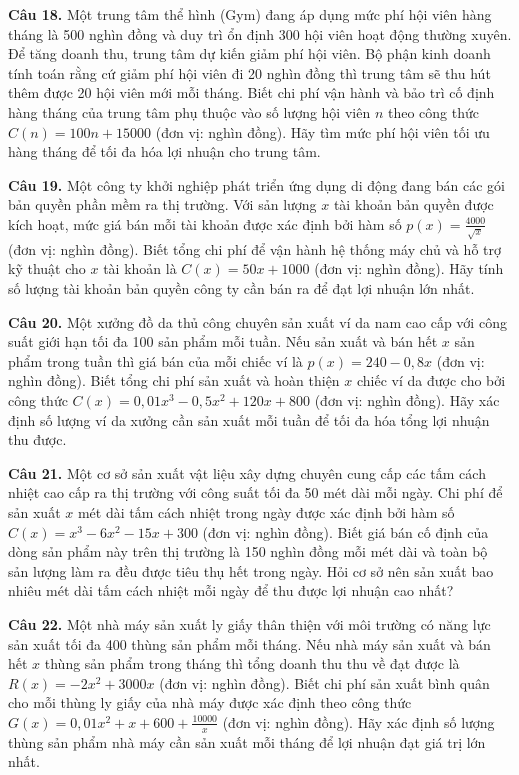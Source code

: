 \documentclass[12pt]{article}
\begin{document}
	\vspace{0.6cm}
	\noindent \textbf{Câu 18.} Một trung tâm thể hình (Gym) đang áp dụng mức phí hội viên hàng tháng là 500 nghìn đồng và duy trì ổn định 300 hội viên hoạt động thường xuyên. Để tăng doanh thu, trung tâm dự kiến giảm phí hội viên. Bộ phận kinh doanh tính toán rằng cứ giảm phí hội viên đi 20 nghìn đồng thì trung tâm sẽ thu hút thêm được 20 hội viên mới mỗi tháng. Biết chi phí vận hành và bảo trì cố định hàng tháng của trung tâm phụ thuộc vào số lượng hội viên $n$ theo công thức $C(n) = 100n + 15000$ (đơn vị: nghìn đồng). Hãy tìm mức phí hội viên tối ưu hàng tháng để tối đa hóa lợi nhuận cho trung tâm.
	
	\noindent \textbf{Câu 19.} Một công ty khởi nghiệp phát triển ứng dụng di động đang bán các gói bản quyền phần mềm ra thị trường. Với sản lượng $x$ tài khoản bản quyền được kích hoạt, mức giá bán mỗi tài khoản được xác định bởi hàm số $p(x) = \frac{4000}{\sqrt{x}}$ (đơn vị: nghìn đồng). Biết tổng chi phí để vận hành hệ thống máy chủ và hỗ trợ kỹ thuật cho $x$ tài khoản là $C(x) = 50x + 1000$ (đơn vị: nghìn đồng). Hãy tính số lượng tài khoản bản quyền công ty cần bán ra để đạt lợi nhuận lớn nhất.
	
	\vspace{0.6cm}
	\noindent \textbf{Câu 20.} Một xưởng đồ da thủ công chuyên sản xuất ví da nam cao cấp với công suất giới hạn tối đa 100 sản phẩm mỗi tuần. Nếu sản xuất và bán hết $x$ sản phẩm trong tuần thì giá bán của mỗi chiếc ví là $p(x) = 240 - 0,8x$ (đơn vị: nghìn đồng). Biết tổng chi phí sản xuất và hoàn thiện $x$ chiếc ví da được cho bởi công thức $C(x) = 0,01x^3 - 0,5x^2 + 120x + 800$ (đơn vị: nghìn đồng). Hãy xác định số lượng ví da xưởng cần sản xuất mỗi tuần để tối đa hóa tổng lợi nhuận thu được.
	
	\vspace{0.6cm}
	\noindent \textbf{Câu 21.} Một cơ sở sản xuất vật liệu xây dựng chuyên cung cấp các tấm cách nhiệt cao cấp ra thị trường với công suất tối đa 50 mét dài mỗi ngày. Chi phí để sản xuất $x$ mét dài tấm cách nhiệt trong ngày được xác định bởi hàm số $C(x) = x^3 - 6x^2 - 15x + 300$ (đơn vị: nghìn đồng). Biết giá bán cố định của dòng sản phẩm này trên thị trường là 150 nghìn đồng mỗi mét dài và toàn bộ sản lượng làm ra đều được tiêu thụ hết trong ngày. Hỏi cơ sở nên sản xuất bao nhiêu mét dài tấm cách nhiệt mỗi ngày để thu được lợi nhuận cao nhất?
	
	\vspace{0.6cm}
	\noindent \textbf{Câu 22.} Một nhà máy sản xuất ly giấy thân thiện với môi trường có năng lực sản xuất tối đa 400 thùng sản phẩm mỗi tháng. Nếu nhà máy sản xuất và bán hết $x$ thùng sản phẩm trong tháng thì tổng doanh thu thu về đạt được là $R(x) = -2x^2 + 3000x$ (đơn vị: nghìn đồng). Biết chi phí sản xuất bình quân cho mỗi thùng ly giấy của nhà máy được xác định theo công thức $G(x) = 0,01x^2 + x + 600 + \frac{10000}{x}$ (đơn vị: nghìn đồng). Hãy xác định số lượng thùng sản phẩm nhà máy cần sản xuất mỗi tháng để lợi nhuận đạt giá trị lớn nhất.
	
\end{document}
